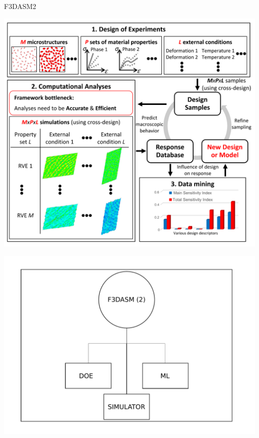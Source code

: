 \documentclass[aspectratio=169]{beamer}
\begin{document}
\begin{frame}{F3DASM2}
  \begin{minipage}{0.5\textwidth}
    \includegraphics[width=\textwidth]{Figures/DDD.png}
  \end{minipage}%
  \begin{minipage}{0.5\textwidth}
    \includegraphics[width=\textwidth]{Figures/F3DASM2.pdf}
  \end{minipage}
\end{frame}
\end{document}

